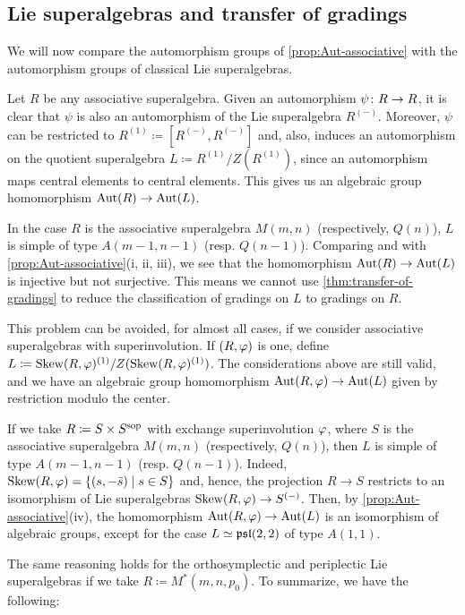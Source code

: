 \subsection{Lie superalgebras and transfer of gradings}

We will now compare the automorphism groups of \cref{prop:Aut-associative} with the automorphism groups of classical Lie superalgebras. 

Let $R$ be any associative superalgebra. 
Given an automorphism $\psi\colon R \to R$, it is clear that $\psi$ is also an automorphism of the Lie superalgebra $R^{(-)}$. 
Moreover, $\psi$ can be restricted to $R^{(1)} \coloneqq [ R^{(-)}, R^{(-)} ]$ and, also, induces an automorphism on the quotient superalgebra $L \coloneqq R^{(1)}/Z(R^{(1)})$, since an automorphism maps central elements to central elements. 
This gives us an algebraic group homomorphism $\operatorname{Aut}(R) \to \operatorname{Aut}(L)$. 

In the case $R$ is the associative superalgebra $M(m,n)$ (respectively, $Q(n)$), $L$ is simple of type $A(m-1, n-1)$ (resp. $Q(n-1)$). 
Comparing \cite[Theorem 1]{serganova} and \cite[Theorem 4.1]{Pianzola} with \cref{prop:Aut-associative}(i, ii, iii), we see that the homomorphism $\operatorname{Aut}(R) \to \operatorname{Aut}(L)$ is injective but not surjective. 
This means we cannot use \cref{thm:transfer-of-gradings} to reduce the classification of gradings on $L$ to gradings on $R$. 

This problem can be avoided, for almost all cases, if we consider associative superalgebras with superinvolution. 
If $(R, \varphi)$ is one, define $L \coloneqq \operatorname{Skew}(R, \varphi)^{(1)}/Z( \operatorname{Skew}(R, \varphi)^{(1)} )$. 
The considerations above are still valid, and we have an algebraic group homomorphism $\operatorname{Aut}(R, \varphi) \to \operatorname{Aut}(L)$ given by restriction modulo the center. 

If we take $R \coloneqq S\times S^{\mathrm{sop}}$ with exchange superinvolution $\varphi$, where $S$ is the associative superalgebra $M(m,n)$ (respectively, $Q(n)$), then $L$ %
is simple of type $A(m-1, n-1)$ (resp. $Q(n-1)$). 
Indeed, $\operatorname{Skew}(R, \varphi) = \{ (s, -\bar s) \mid s\in S \}$ and, hence, the projection $R \to S$ restricts to an isomorphism of Lie superalgebras $\operatorname{Skew}(R, \varphi) \to S^{(-)}$. 
Then, by \cref{prop:Aut-associative}(iv), the homomorphism $\operatorname{Aut}(R, \varphi) \to \operatorname{Aut}(L)$ is an isomorphism of algebraic groups, except for the case $L \simeq \mathfrak{psl}(2,2)$ of type $A(1,1)$.


The same reasoning holds for the orthosymplectic and periplectic Lie superalgebras if we take $R \coloneqq M^*(m, n, p_0)$. 
To summarize, we have the following:


